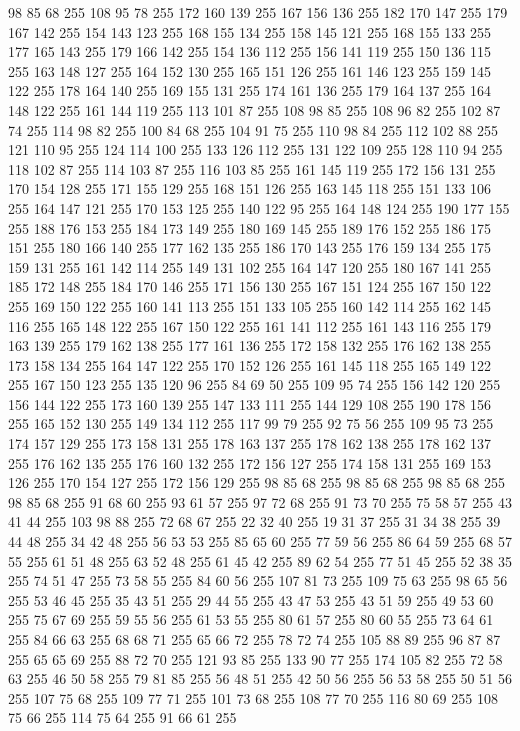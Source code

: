 98 85 68 255 108 95 78 255 172 160 139 255 167 156 136 255 182 170 147 255 179 167 142 255 154 143 123 255 168 155 134 255 158 145 121 255 168 155 133 255 177 165 143 255 179 166 142 255 154 136 112 255 156 141 119 255 150 136 115 255 163 148 127 255 164 152 130 255 165 151 126 255 161 146 123 255 159 145 122 255 178 164 140 255 169 155 131 255 174 161 136 255 179 164 137 255 164 148 122 255 161 144 119 255 113 101 87 255 108 98 85 255 108 96 82 255 102 87 74 255 114 98 82 255 100 84 68 255 104 91 75 255 110 98 84 255 112 102 88 255 121 110 95 255 124 114 100 255 133 126 112 255 131 122 109 255 128 110 94 255 118 102 87 255 114 103 87 255 116 103 85 255 161 145 119 255 172 156 131 255 170 154 128 255 171 155 129 255 168 151 126 255 163 145 118 255 151 133 106 255 164 147 121 255 170 153 125 255 140 122 95 255 164 148 124 255 190 177 155 255 188 176 153 255 184 173 149 255 180 169 145 255 189 176 152 255 186 175 151 255 180 166 140 255 177 162 135 255 186 170 143 255 176 159 134 255
175 159 131 255 161 142 114 255 149 131 102 255 164 147 120 255 180 167 141 255 185 172 148 255 184 170 146 255 171 156 130 255 167 151 124 255 167 150 122 255 169 150 122 255 160 141 113 255 151 133 105 255 160 142 114 255 162 145 116 255 165 148 122 255 167 150 122 255 161 141 112 255 161 143 116 255 179 163 139 255 179 162 138 255 177 161 136 255 172 158 132 255 176 162 138 255 173 158 134 255 164 147 122 255 170 152 126 255 161 145 118 255 165 149 122 255 167 150 123 255 135 120 96 255 84 69 50 255 109 95 74 255 156 142 120 255 156 144 122 255 173 160 139 255 147 133 111 255 144 129 108 255 190 178 156 255 165 152 130 255 149 134 112 255 117 99 79 255 92 75 56 255 109 95 73 255 174 157 129 255 173 158 131 255 178 163 137 255 178 162 138 255 178 162 137 255 176 162 135 255 176 160 132 255 172 156 127 255 174 158 131 255 169 153 126 255 170 154 127 255 172 156 129 255 98 85 68 255 98 85 68 255 98 85 68 255 98 85 68 255 91 68 60 255 93 61 57 255 97 72 68 255 91 73 70 255
75 58 57 255 43 41 44 255 103 98 88 255 72 68 67 255 22 32 40 255 19 31 37 255 31 34 38 255 39 44 48 255 34 42 48 255 56 53 53 255 85 65 60 255 77 59 56 255 86 64 59 255 68 57 55 255 61 51 48 255 63 52 48 255 61 45 42 255 89 62 54 255 77 51 45 255 52 38 35 255 74 51 47 255 73 58 55 255 84 60 56 255 107 81 73 255 109 75 63 255 98 65 56 255 53 46 45 255 35 43 51 255 29 44 55 255 43 47 53 255 43 51 59 255 49 53 60 255 75 67 69 255 59 55 56 255 61 53 55 255 80 61 57 255 80 60 55 255 73 64 61 255 84 66 63 255 68 68 71 255 65 66 72 255 78 72 74 255 105 88 89 255 96 87 87 255 65 65 69 255 88 72 70 255 121 93 85 255 133 90 77 255 174 105 82 255 72 58 63 255 46 50 58 255 79 81 85 255 56 48 51 255 42 50 56 255 56 53 58 255 50 51 56 255 107 75 68 255 109 77 71 255 101 73 68 255 108 77 70 255 116 80 69 255 108 75 66 255 114 75 64 255 91 66 61 255
